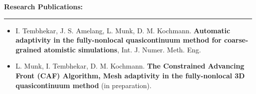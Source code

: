\documentclass[10pt,fleqn]{article}
\begin{document}
\vspace{-5pt}
\textbf{Research Publications:}
\vspace{-25pt}
\begin{center}
\rule{\textwidth}{.4pt}
\end{center}
\vspace{-15pt}
\begin{itemize}
\setlength{\itemsep}{0pt}
\setlength{\parskip}{0pt}
\setlength{\itemindent}{-5mm}
\item[] I. Tembhekar, J. S. Amelang, L. Munk, D. M. Kochmann. \textbf{Automatic adaptivity in the fully-nonlocal quasicontinuum method for coarse-grained atomistic simulations}, Int. J. Numer. Meth. Eng.
\item[] L. Munk, I. Tembhekar, D. M. Kochmann. \textbf{The Constrained Advancing Front (CAF) Algorithm, Mesh adaptivity in the fully-nonlocal 3D quasicontinuum method} (in preparation). 
\end{itemize}
\end{document}
